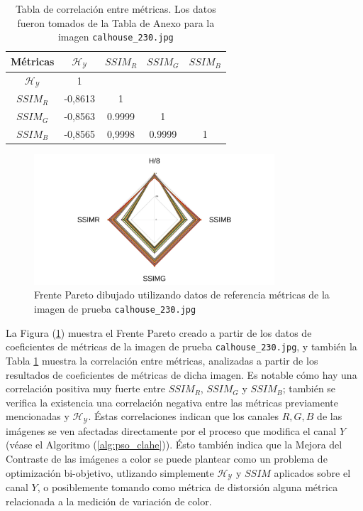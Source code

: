 \begin{table}[H]
\setlength{\abovecaptionskip}{2pt plus 3pt minus 2pt} %
\caption[Parámetros de entrada para $MOPSO$]{Tabla de correlación entre métricas. Los datos fueron tomados de la Tabla de Anexo para la imagen \texttt{calhouse\_230.jpg}}
\begin{center}
 \begin{tabular}{||c | c c c c||} 
 \hline
Métricas & $\mathscr{H_Y}$ & $SSIM_R$ & $SSIM_G$ & $SSIM_B$ \\ 
\hline
$\mathscr{H_Y}$ & 1 &   &   &  \\ 
\hline
$SSIM_R$ & -0,8613  & 1 &  &  \\ 
\hline
$SSIM_G$ & -0,8563 & 0.9999   & 1   &  \\ 
\hline
$SSIM_B$ & -0,8565 & 0,9998   & 0.9999   & 1 \\ 
\hline
\end{tabular}
\end{center}
\label{table:correlacion1}
\end{table}

\begin{figure}[H]
    \centering
        \includegraphics[width=0.80\textwidth]{./Figures/calhouse_230/calhouse_230_2.jpg}
    \caption{Frente Pareto dibujado utilizando datos de referencia métricas de la imagen de prueba \texttt{calhouse\_230.jpg} }\label{fig:pareto_front}
\end{figure}


La Figura (\ref{fig:pareto_front}) muestra el Frente Pareto creado a partir de los datos de coeficientes de métricas de la imagen de prueba \texttt{calhouse\_230.jpg}, y también la Tabla \ref{table:correlacion1} muestra la correlación entre métricas, analizadas a partir de los resultados de coeficientes de métricas de dicha imagen. Es notable cómo hay una correlación positiva muy fuerte entre $SSIM_R$, $SSIM_G$ y $SSIM_B$; también se verifica la existencia una correlación negativa entre las métricas previamente mencionadas y $\mathscr{H_Y}$. Éstas correlaciones indican que los canales  $R,G,B$ de las imágenes se ven afectadas directamente por el proceso que modifica el canal $Y$ (véase el Algoritmo (\ref{alg:pso_clahe})). Ésto también indica que la Mejora del Contraste de las imágenes a color se puede plantear como un problema de optimización bi-objetivo, utlizando simplemente $\mathscr{H_Y}$ y $SSIM$ aplicados sobre el canal $Y$, o posiblemente tomando como métrica de distorsión alguna métrica relacionada a la medición de variación de color.

